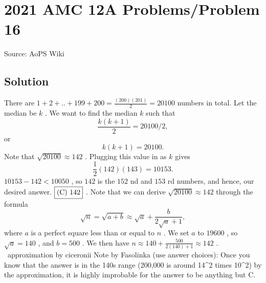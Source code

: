 \documentclass[12pt]{article}
\begin{document}
\section*{{2021 AMC 12A Problems/Problem 16}}
Source: AoPS Wiki

\subsection*{Solution}
There are $1+2+..+199+200=\frac{(200)(201)}{2}=20100$ numbers in total. Let the median be $k$ . We want to find the median $k$ such that \[\frac{k(k+1)}{2}=20100/2,\] or \[k(k+1)=20100.\] Note that $\sqrt{20100} \approx 142$ . Plugging this value in as $k$ gives \[\frac{1}{2}(142)(143)=10153.\] $10153-142<10050$ , so $142$ is the $152$ nd and $153$ rd numbers, and hence, our desired answer. $\fbox{(C) 142}$ . Note that we can derive $\sqrt{20100} \approx 142$ through the formula \[\sqrt{n} = \sqrt{a+b} \approx \sqrt{a} + \frac{b}{2\sqrt{a} + 1},\] where $a$ is a perfect square less than or equal to $n$ . We set $a$ to $19600$ , so $\sqrt{a} = 140$ , and $b = 500$ . We then have $n \approx 140 + \frac{500}{2(140)+1} \approx 142$ . ~approximation by ciceronii Note by Fasolinka (use answer choices): Once you know that the answer is in the 140s range (200,000 is around 14^2 times 10^2) by the approximation, it is highly improbable for the answer to be anything but C.
\end{document}
